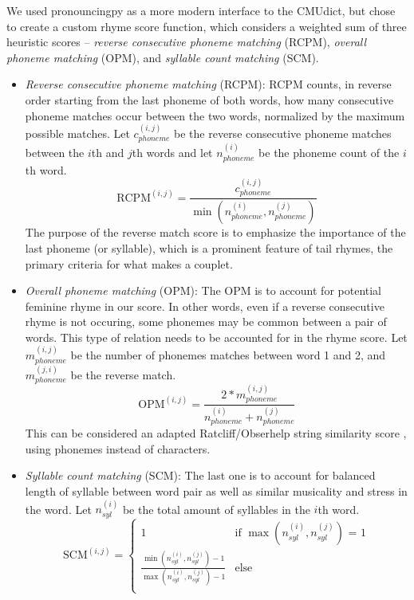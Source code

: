 \documentclass[11pt,a4paper]{article}
\begin{document}
We used pronouncingpy as a more modern interface to the CMUdict, but chose to create a custom rhyme score function, which considers a weighted sum of three heuristic scores -- \textit{reverse consecutive phoneme matching} (RCPM), \textit{overall phoneme matching} (OPM), and \textit{syllable count matching} (SCM).
\begin{itemize}
	\item \textit{Reverse consecutive phoneme matching} (RCPM):
	RCPM counts, in reverse order starting from the last phoneme of both words, how many consecutive phoneme matches occur between the two words, normalized by the maximum possible matches. Let $c^{(i,j)}_{phoneme}$ be the reverse consecutive phoneme matches between the $i$th and $j$th words and let $n^{(i)}_{phoneme}$ be the phoneme count of the $i$th word.
	$$\textrm{RCPM}^{(i,j)} = \frac{c^{(i,j)}_{phoneme}}{\min(n^{(i)}_{phoneme}, n^{(j)}_{phoneme})}$$
	The purpose of the reverse match score is to emphasize the importance of the last phoneme (or syllable), which is a prominent feature of tail rhymes, the primary criteria for what makes a couplet.
	\item \textit{Overall phoneme matching} (OPM):
		The OPM is to account for potential feminine rhyme in our score. In other words, even if a reverse consecutive rhyme is not occuring, some phonemes may be common between a pair of words. This type of relation needs to be accounted for in the rhyme score. Let $m^{(i,j)}_{phoneme}$ be the number of phonemes matches between word 1 and 2, and $m^{(j, i)}_{phoneme}$ be the reverse match.
	$$\textrm{OPM}^{(i,j)} = \frac{2 * m^{(i,j)}_{phoneme}}{n^{(i)}_{phoneme} + n^{(j)}_{phoneme}}$$
		This can be considered an adapted Ratcliff/Obserhelp string similarity score \cite{ratcliff}, using phonemes instead of characters.
	\item \textit{Syllable count matching} (SCM):
	The last one is to account for balanced length of syllable between word pair as well as similar musicality and stress in the word. Let $n^{(i)}_{syl}$ be the total amount of syllables in the $i$th word.
	\begin{equation}
  	\textrm{SCM}^{(i,j)} = 
    	\begin{cases}
      		1 & \text{if $\max(n^{(i)}_{syl}, n^{(j)}_{syl})$ = 1}\\
		\frac{\min(n^{(i)}_{syl}, n^{(j)}_{syl}) - 1}{\max(n^{(i)}_{syl}, n^{(j)}_{syl}) - 1} & \text{else}\\
    	\end{cases}       
	\end{equation}
\end{itemize}
\end{document}
